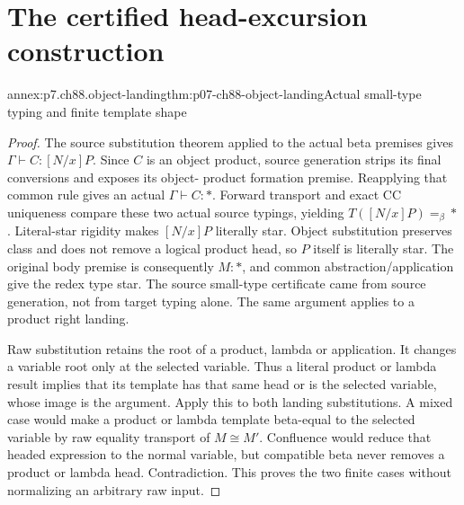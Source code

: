 \section{The certified head-excursion construction}
\label{sec:annex-p07-ch88-object-product}

\begin{annexitem}{annex:p7.ch88.object-landing}{thm:p07-ch88-object-landing}{Actual small-type typing and finite template shape}
\begin{proof}
The source substitution theorem applied to the actual beta premises
gives \(\Gamma\vdash C:[N/x]P\). Since \(C\) is an object product,
source generation strips its final conversions and exposes its object-
product formation premise. Reapplying that common rule gives an actual
\(\Gamma\vdash C:\ast\). Forward transport and exact CC uniqueness
compare these two actual source typings, yielding
\(T([N/x]P)=_\beta\ast\). Literal-star rigidity makes
\([N/x]P\) literally star. Object substitution preserves class and
does not remove a logical product head, so \(P\) itself is literally
star. The original body premise is consequently \(M:\ast\), and
common abstraction/application give the redex type star. The source
small-type certificate came from source generation, not from target
typing alone. The same argument applies to a product right landing.

Raw substitution retains the root of a product, lambda or application.
It changes a variable root only at the selected variable. Thus a literal
product or lambda result implies that its template has that same head
or is the selected variable, whose image is the argument. Apply this
to both landing substitutions. A mixed case would make a product or
lambda template beta-equal to the selected variable by raw equality
transport of \(M\cong M'\). Confluence would reduce that headed
expression to the normal variable, but compatible beta never removes
a product or lambda head. Contradiction. This proves the two finite
cases without normalizing an arbitrary raw input.
\end{proof}
\end{annexitem}

